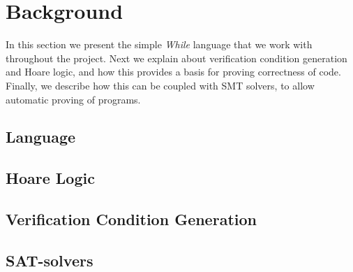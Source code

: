 \section{Background}\label{sec:Background}
In this section we present the simple \textit{While} language that we work with throughout the project.
Next we explain about verification condition generation and Hoare logic, and how this provides a basis for proving correctness of code.
Finally, we describe how this can be coupled with SMT solvers, to allow automatic proving of programs.

\subsection{Language}\label{sec:Language}


\subsection{Hoare Logic}\label{sec:hoare}


\subsection{Verification Condition Generation}\label{sec:vcg}


\subsection{SAT-solvers}

